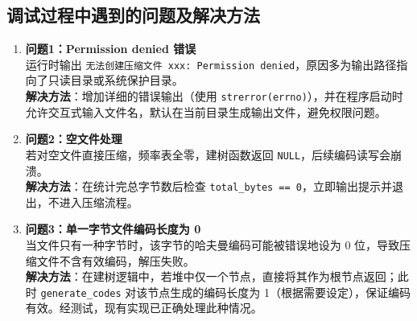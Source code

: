 \documentclass[UTF8]{ctexart}
\begin{document}
\subsection{调试过程中遇到的问题及解决方法}
\begin{enumerate}
    \item \textbf{问题1：Permission denied 错误} \\
    运行时输出 \texttt{无法创建压缩文件 xxx: Permission denied}，原因多为输出路径指向了只读目录或系统保护目录。\\
    \textbf{解决方法}：增加详细的错误输出（使用 \texttt{strerror(errno)}），并在程序启动时允许交互式输入文件名，默认在当前目录生成输出文件，避免权限问题。

    \item \textbf{问题2：空文件处理} \\
    若对空文件直接压缩，频率表全零，建树函数返回 \texttt{NULL}，后续编码读写会崩溃。\\
    \textbf{解决方法}：在统计完总字节数后检查 \texttt{total\_bytes == 0}，立即输出提示并退出，不进入压缩流程。

    \item \textbf{问题3：单一字节文件编码长度为 0} \\
    当文件只有一种字节时，该字节的哈夫曼编码可能被错误地设为 0 位，导致压缩文件不含有效编码，解压失败。\\
    \textbf{解决方法}：在建树逻辑中，若堆中仅一个节点，直接将其作为根节点返回；此时 \texttt{generate\_codes} 对该节点生成的编码长度为 1（根据需要设定），保证编码有效。经测试，现有实现已正确处理此种情况。
\end{enumerate}
\end{document}
